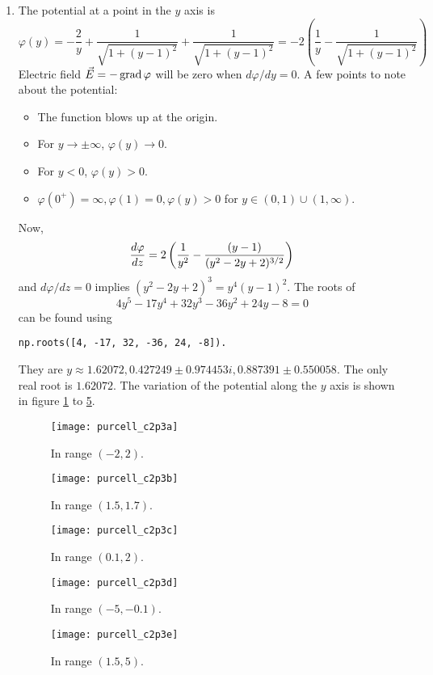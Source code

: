 \documentclass{article}
\begin{document}
\begin{enumerate}
\item The potential at a point in the $y$ axis is
\begin{equation}\label{e11}
\varphi(y) = -\frac{2}{y} + \frac{1}{\sqrt{1 + (y - 1)^2}} + \frac{1}{\sqrt{1 + (y - 1)^2}} 
= -2\left(\frac{1}{y} - \frac{1}{\sqrt{1 + (y - 1)^2}}\right)
\end{equation}
Electric field $\vec{E} = -\operatorname{grad}\varphi$ will be zero when $d\varphi/dy = 0$. 
A few points to note about the potential:
\begin{itemize}
\item The function blows up at the origin.
\item For $y \rightarrow \pm \infty$, $\varphi(y) \rightarrow 0$.
\item For $y < 0$, $\varphi(y) > 0$.
\item $\varphi(0^+) = \infty, \varphi(1) = 0, \varphi(y) > 0$ for $y \in (0, 1) \cup (1, \infty)$.
\end{itemize}
Now,
\[
\frac{d{\varphi}}{d{z}} = 2\left(\frac{1}{y^2} - \frac{(y - 1)}{(y^2 - 2y + 2)^{3/2}}\right)
\]
and $d\varphi/dz = 0$ implies $(y^2 - 2y + 2)^3 = y^4(y - 1)^2$. The roots of
\[
4 y^5 - 17 y^4 + 32 y^3 - 36 y^2 + 24 y - 8 = 0
\]
can be found using
\begin{verbatim}
np.roots([4, -17, 32, -36, 24, -8]).
\end{verbatim}
They are $y \approx 1.62072, 0.427249 \pm 0.974453 i, 0.887391 \pm 0.550058$. The only 
real root is $1.62072$.
The variation of the potential along the $y$ axis is shown in figure \ref{c2f3a} to 
\ref{c2f3e}.
\begin{figure}[!ht]
\center
\texttt{[image: purcell\_c2p3a]}
\caption{In range $(-2, 2)$.}
\label{c2f3a}
\end{figure}
\begin{figure}[!ht]
\center
\texttt{[image: purcell\_c2p3b]}
\caption{In range $(1.5, 1.7)$.}
\label{c2f3b}
\end{figure}
\begin{figure}[!ht]
\center
\texttt{[image: purcell\_c2p3c]}
\caption{In range $(0.1, 2)$.}
\label{c2f3c}
\end{figure}
\begin{figure}[!ht]
\center
\texttt{[image: purcell\_c2p3d]}
\caption{In range $(-5, -0.1)$.}
\label{c2f3d}
\end{figure}
\begin{figure}[!ht]
\center
\texttt{[image: purcell\_c2p3e]}
\caption{In range $(1.5, 5)$.}
\label{c2f3e}
\end{figure}


\end{enumerate}
\end{document}
